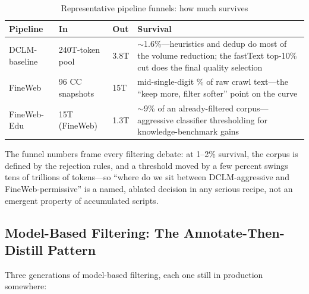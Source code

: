 \begin{table}[H]
\centering
\small
\caption{Representative pipeline funnels: how much survives}
\label{tab:pretrain_funnel}
\begin{tabularx}{\textwidth}{lllX}
\toprule
\textbf{Pipeline} & \textbf{In} & \textbf{Out} & \textbf{Survival} \\
\midrule
DCLM-baseline & 240T-token pool & 3.8T & $\sim$1.6\%---heuristics and dedup do most of the volume reduction; the fastText top-10\% cut does the final quality selection \\
FineWeb & 96 CC snapshots & 15T & mid-single-digit \% of raw crawl text---the ``keep more, filter softer'' point on the curve \\
FineWeb-Edu & 15T (FineWeb) & 1.3T & $\sim$9\% of an already-filtered corpus---aggressive classifier thresholding for knowledge-benchmark gains \\
\bottomrule
\end{tabularx}
\end{table}

The funnel numbers frame every filtering debate: at 1--2\% survival, the corpus is defined by the rejection rules, and a threshold moved by a few percent swings tens of trillions of tokens---so ``where do we sit between DCLM-aggressive and FineWeb-permissive'' is a named, ablated decision in any serious recipe, not an emergent property of accumulated scripts.

\subsection{Model-Based Filtering: The Annotate-Then-Distill Pattern}

Three generations of model-based filtering, each one still in production somewhere:

